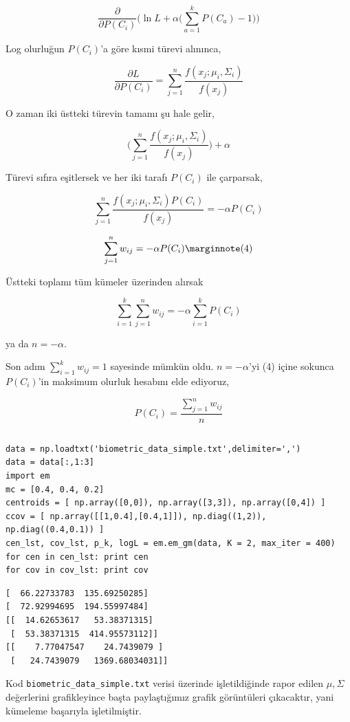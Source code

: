 \documentclass[12pt,fleqn]{article}\usepackage{../../common}
\begin{document}
$$ 
\frac{\partial }{\partial P(C_i)} \bigg(
\ln L + \alpha \big( \sum _{a=1}^{k} P(C_a)-1 \big)
\bigg)
$$

Log olurluğun $P(C_i)$'a göre kısmi türevi alınınca,

$$ 
\frac{\partial L}{\partial P(C_i)} = 
\sum _{j=1}^{n} \frac{f(x_j;\mu_i,\Sigma_i)}{f(x_j)}
$$

O zaman iki üstteki türevin tamamı şu hale gelir,

$$ 
\bigg( \sum _{j=1}^{n} \frac{f(x_j;\mu_i,\Sigma_i)}{f(x_j)} \bigg) + \alpha
$$

Türevi sıfıra eşitlersek ve her iki tarafı $P(C_i)$ ile çarparsak, 

$$ 
\sum _{j=1}^{n} \frac{f(x_j;\mu_i,\Sigma_i) P(C_i)}{f(x_j)} = -\alpha P(C_i)
$$

$$ 
\sum _{j=1}^{n} w_{ij} = -\alpha P(C_i)
\mlabel{4}
$$

Üstteki toplamı tüm kümeler üzerinden alırsak

$$ 
\sum _{i=1}^{k} \sum _{j=1}^{n} w_{ij} = -\alpha \sum _{i=1}^{k} P(C_i)
$$

ya da $n = -\alpha$. 


Son adım $\sum_{i=1}^{k}w_{ij}=1$ sayesinde mümkün oldu. $n = -\alpha$'yi
(4) içine sokunca $P(C_i)$'in maksimum olurluk hesabını elde ediyoruz, 

$$ P(C_i) = \frac{\sum _{j=1}^{n}w_{ij}}{n}$$


\inputminted[fontsize=\footnotesize]{python}{em.py}

\begin{verbatim}
data = np.loadtxt('biometric_data_simple.txt',delimiter=',')
data = data[:,1:3]
import em
mc = [0.4, 0.4, 0.2] 
centroids = [ np.array([0,0]), np.array([3,3]), np.array([0,4]) ]
ccov = [ np.array([[1,0.4],[0.4,1]]), np.diag((1,2)), np.diag((0.4,0.1)) ]
cen_lst, cov_lst, p_k, logL = em.em_gm(data, K = 2, max_iter = 400)
for cen in cen_lst: print cen
for cov in cov_lst: print cov
\end{verbatim}

\begin{verbatim}
[  66.22733783  135.69250285]
[  72.92994695  194.55997484]
[[  14.62653617   53.38371315]
 [  53.38371315  414.95573112]]
[[    7.77047547    24.7439079 ]
 [   24.7439079   1369.68034031]]
\end{verbatim}
Kod \verb!biometric_data_simple.txt! verisi üzerinde işletildiğinde rapor
edilen $\mu,\Sigma$ değerlerini grafikleyince başta paylaştığımız grafik
görüntüleri çıkacaktır, yani kümeleme başarıyla işletilmiştir.
\end{document}
